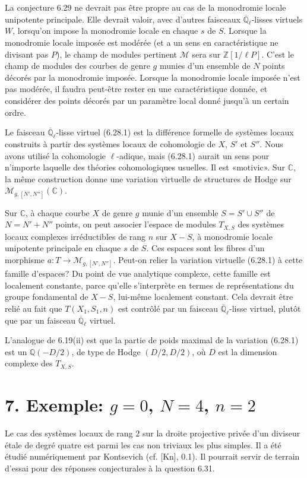 \documentclass[10pt]{article}
\newcommand{\Ql}{\overline{\mathbb Q}_{\ell}}
\newcommand{\C}{\mathbb C}
\newcommand{\Z}{\mathbb Z}
\newcommand{\Q}{\mathbb Q}
\theoremstyle{deligne}
\newcommand{\heading}[1]{\vspace{0.7em}\noindent{\bfseries #1}\quad}
\begin{document}
\heading{6.30.} La conjecture 6.29 ne devrait pas être propre au cas de la monodromie locale unipotente principale. Elle devrait valoir, avec d'autres faisceaux $\Ql$-lisses virtuels $W$, lorsqu'on impose la monodromie locale en chaque $s$ de $S$. Lorsque la monodromie locale imposée est modérée (et a un sens en caractéristique ne divisant pas $P$), le champ de modules pertinent $\mathcal M$ sera sur $\Z[1/\ell P]$. C'est le champ de modules des courbes de genre $g$ munies d'un ensemble de $N$ points décorés par la monodromie imposée. Lorsque la monodromie locale imposée n'est pas modérée, il faudra peut-être rester en une caractéristique donnée, et considérer des points décorés par un paramètre local donné jusqu'à un certain ordre.

\heading{Question 6.31.} Le faisceau $\Ql$-lisse virtuel (6.28.1) est la différence formelle de systèmes locaux construits à partir des systèmes locaux de cohomologie de $X$, $S'$ et $S''$. Nous avons utilisé la cohomologie $\ell$-adique, mais (6.28.1) aurait un sens pour n'importe laquelle des théories cohomologiques usuelles. Il est «motivic». Sur $\C$, la même construction donne une variation virtuelle de structures de Hodge sur $\mathcal M_{g,[N',N'']}(\C)$.

Sur $\C$, à chaque courbe $X$ de genre $g$ munie d'un ensemble $S=S'\cup S''$ de $N=N'+N''$ points, on peut associer l'espace de modules $T_{X,S}$ des systèmes locaux complexes irréductibles de rang $n$ sur $X-S$, à monodromie locale unipotente principale en chaque $s$ de $S$. Ces espaces sont les fibres d'un morphisme $a:T\to\mathcal M_{g,[N',N'']}$. Peut-on relier la variation virtuelle (6.28.1) à cette famille d'espaces? Du point de vue analytique complexe, cette famille est localement constante, parce qu'elle s'interprète en termes de représentations du groupe fondamental de $X-S$, lui-même localement constant. Cela devrait être relié au fait que $T(X_1,S_1,n)$ est contrôlé par un faisceau $\Ql$-lisse virtuel, plutôt que par un faisceau $\Ql$ virtuel.

L'analogue de 6.19(ii) est que la partie de poids maximal de la variation (6.28.1) est un $\Q(-D/2)$, de type de Hodge $(D/2,D/2)$, où $D$ est la dimension complexe des $T_{X,S}$.

\section*{7. Exemple: $g=0$, $N=4$, $n=2$}

Le cas des systèmes locaux de rang $2$ sur la droite projective privée d'un diviseur \'{e}tale de degré quatre est parmi les cas non triviaux les plus simples. Il a été étudié numériquement par Kontsevich (cf. [Kn], 0.1). Il pourrait servir de terrain d'essai pour des réponses conjecturales à la question 6.31.
\end{document}
